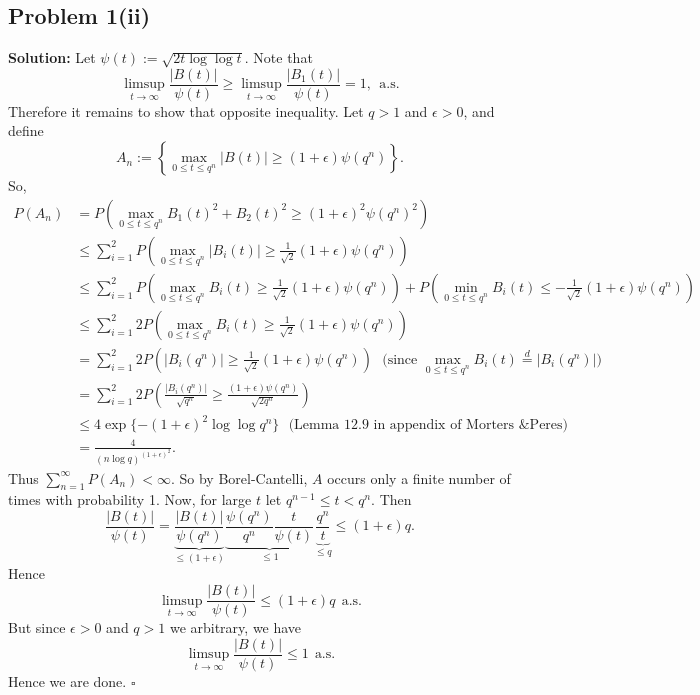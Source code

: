 \documentclass[12pt]{article}
\newcounter{ProofCounter}
\newenvironment{Solution}{\stepcounter{ProofCounter}\textbf{Solution:}}{\hfill$\square$}
\newcommand\toinf{\rightarrow\infty}
\begin{document}
\subsection*{Problem 1(ii)}
\begin{Solution}
  Let $\psi(t) := \sqrt{2t\log\log t}$. Note that
  \[
    \limsup_{t\rightarrow\infty} \frac{|B(t)|}{\psi(t)} \geq \limsup_{t\rightarrow\infty} \frac{|B_1(t)|}{\psi(t)} = 1, \ \ \text{a.s.}
  \]
  Therefore it remains to show that opposite inequality. Let $q > 1$ and $\epsilon > 0$, and define
  \[
    A_n := \left\{ \max_{0\leq t \leq q^n}|B(t)| \geq (1 + \epsilon) \psi(q^n) \right\}.
  \]
  So,
  \begin{align*}
    P(A_n) & = P \left( \max_{0\leq t \leq q^n} B_1(t)^2 + B_2(t)^2 \geq (1 + \epsilon)^2\psi(q^n)^2 \right) \\
    & \leq \sum_{i=1}^{2} P \left( \max_{0\leq t \leq q^n} |B_i(t)| \geq \frac{1}{\sqrt{2}}(1 + \epsilon)\psi(q^n) \right) \\
    & \leq \sum_{i=1}^{2} P \left( \max_{0\leq t \leq q^n} B_i(t) \geq \frac{1}{\sqrt{2}}(1 + \epsilon)\psi(q^n) \right) + P \left( \min_{0\leq t \leq q^n} B_i(t) \leq - \frac{1}{\sqrt{2}}(1 + \epsilon)\psi(q^n) \right) \\
    & \leq \sum_{i=1}^{2} 2 P \left( \max_{0\leq t \leq q^n} B_i(t) \geq \frac{1}{\sqrt{2}}(1 + \epsilon)\psi(q^n) \right) \\
  & = \sum_{i=1}^{2} 2 P \left( |B_i(q^n)| \geq \frac{1}{\sqrt{2}}(1 + \epsilon)\psi(q^n) \right) \ \ \ \text{(since $\max_{0\leq t \leq q^n}B_i(t) \stackrel{d}{=} |B_i(q^n)|$)} \\
    & = \sum_{i=1}^{2} 2 P \left( \frac{|B_i(q^n)|}{\sqrt{q^n}} \geq \frac{(1 + \epsilon)\psi(q^n)}{\sqrt{2q^n}} \right) \\
    & \leq 4 \exp\{ -(1 + \epsilon)^2 \log \log q^n \} \ \ \ \text{(Lemma 12.9 in appendix of Morters \& Peres)} \\
    & = \frac{4}{(n\log q)^{(1+\epsilon)^2}}.
  \end{align*}
  Thus $\sum_{n=1}^{\infty} P(A_n) < \infty$. So by Borel-Cantelli, $A$ occurs only a finite number of times with probability 1. Now, for large $t$ let $q^{n-1} \leq t < q^{n}$. Then
  \[
    \frac{|B(t)|}{\psi(t)} = \underbrace{\frac{|B(t)|}{\psi(q^n)}}_{\leq (1 + \epsilon)} \underbrace{\frac{\psi(q^n)}{q^n} \frac{t}{\psi(t)}}_{\leq 1} \underbrace{\frac{q^n}{t}}_{\leq q} \leq (1 + \epsilon) q.
  \]
  Hence
  \[
    \limsup_{t \rightarrow \infty} \frac{|B(t)|}{\psi(t)} \leq (1 + \epsilon)q \ \ \text{a.s.}
  \]
  But since $\epsilon > 0$ and $q > 1$ we arbitrary, we have
  \[
    \limsup_{t\toinf} \frac{|B(t)|}{\psi(t)} \leq 1 \ \ \text{a.s.}
  \]
  Hence we are done.
\end{Solution}
\end{document}
